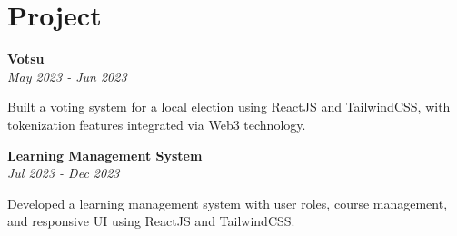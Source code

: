 \section*{Project}

\textbf{Votsu} \\
\textit{May 2023 - Jun 2023}

\vspace{0.5em}

Built a voting system for a local election using ReactJS and TailwindCSS, with tokenization features integrated via Web3 technology.

\vspace{1em}

\textbf{Learning Management System} \\
\textit{Jul 2023 - Dec 2023}

\vspace{0.5em}

Developed a learning management system with user roles, course management, and responsive UI using ReactJS and TailwindCSS.
